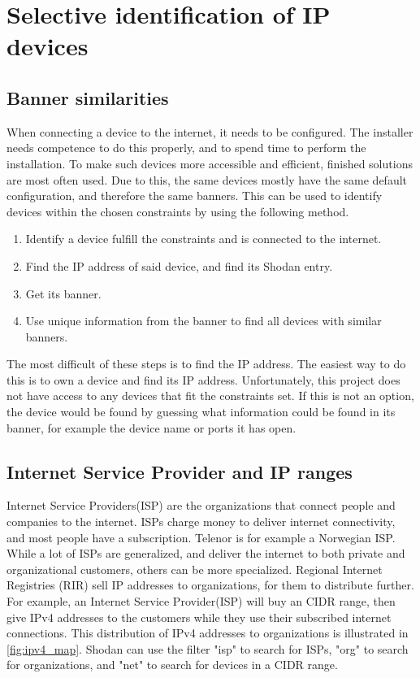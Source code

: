 \section{Selective identification of IP devices}

\subsection{Banner similarities}
When connecting a device to the internet, it needs to be configured. The installer needs competence to do this properly, and to spend time to perform the installation. To make such devices more accessible and efficient, finished solutions are most often used. Due to this, the same devices mostly have the same default configuration, and therefore the same banners. This can be used to identify devices within the chosen constraints by using the following method.
\begin{enumerate}
    \item Identify a device fulfill the constraints and is connected to the internet.
    \item Find the IP address of said device, and find its Shodan entry.
    \item Get its banner.
    \item Use unique information from the banner to find all devices with similar banners.
\end{enumerate}
The most difficult of these steps is to find the IP address. The easiest way to do this is to own a device and find its IP address. Unfortunately, this project does not have access to any devices that fit the constraints set.
If this is not an option, the device would be found by guessing what information could be found in its banner, for example the device name or ports it has open.


\subsection{Internet Service Provider and IP ranges} \label{sec:isp_method}
Internet Service Providers(ISP) are the organizations that connect people and companies to the internet. ISPs charge money to deliver internet connectivity, and most people have a subscription. Telenor is for example a Norwegian ISP. While a lot of ISPs are generalized, and deliver the internet to both private and organizational customers, others can be more specialized. 
Regional Internet Registries (RIR) sell IP addresses to organizations, for them to distribute further. For example, an Internet Service Provider(ISP) will buy an CIDR range, then give IPv4 addresses to the customers while they use their subscribed internet connections. This distribution of IPv4 addresses to organizations is illustrated in \cref{fig:ipv4_map}. Shodan can use the filter "isp" to search for ISPs, "org" to search for organizations, and "net" to search for devices in a CIDR range. 

